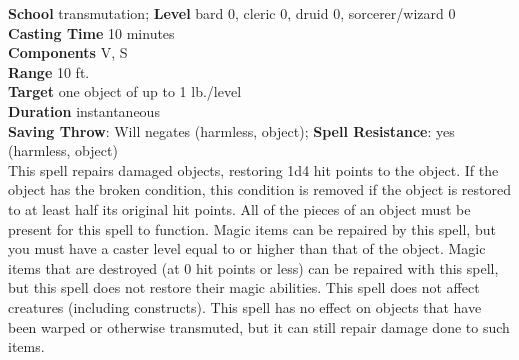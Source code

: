 \textbf{School }transmutation; \textbf{Level }bard 0, cleric 0, druid 0, sorcerer/wizard 0\\
\textbf{Casting Time }10 minutes\\
\textbf{Components }V, S\\
\textbf{Range }10 ft.\\
\textbf{Target} one object of up to 1 lb./level\\
\textbf{Duration }instantaneous\\
\textbf{Saving Throw}: Will negates (harmless, object); \textbf{Spell Resistance}: yes (harmless, object)\\
This spell repairs damaged objects, restoring 1d4 hit points to the object. If the object has the broken condition, this condition is removed if the object is restored to at least half its original hit points. All of the pieces of an object must be present for this spell to function. Magic items can be repaired by this spell, but you must have a caster level equal to or higher than that of the object. Magic items that are destroyed (at 0 hit points or less) can be repaired with this spell, but this spell does not restore their magic abilities. This spell does not affect creatures (including constructs). This spell has no effect on objects that have been warped or otherwise transmuted, but it can still repair damage done to such items.\\
